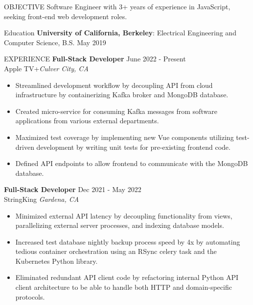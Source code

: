 \documentclass{resume}
\begin{document}
    \begin{rSection}{OBJECTIVE}
        {Software Engineer with 3+ years of experience in JavaScript, seeking front-end web development roles.}
    \end{rSection}

    \begin{rSection}{Education}
        {\bf University of California, Berkeley}: Electrical Engineering and Computer Science, B.S. \hfill {May 2019}
    \end{rSection}

    \begin{rSection}{EXPERIENCE}
        \textbf{Full-Stack Developer} \hfill June 2022 - Present\\
        Apple TV+\hfill \textit{Culver City, CA}
        \begin{itemize}
            \itemsep -3pt {} 
            \item Streamlined development workflow by decoupling API from cloud infrastructure by containerizing Kafka broker and MongoDB database.
            \item Created micro-service for consuming Kafka messages from software applications from various external departments. 
            \item Maximized test coverage by implementing new Vue components utilizing test-driven development by writing unit tests for pre-existing frontend code.
            \item Defined API endpoints to allow frontend to communicate with the MongoDB database.
        \end{itemize}
        \textbf{Full-Stack Developer} \hfill Dec 2021 - May 2022\\
        StringKing \hfill \textit{Gardena, CA}
        \begin{itemize}
            \itemsep -3pt {} 
            \item Minimized external API latency by decoupling functionality from views, parallelizing external server processes, and indexing database models.
            \item Increased test database nightly backup process speed by 4x by automating tedious container orchestration using an RSync celery task and the Kubernetes Python library.
            \item Eliminated redundant API client code by refactoring internal Python API client architecture to be able to handle both HTTP and domain-specific protocols.
        \end{itemize}

\end{rSection}
\end{document}
